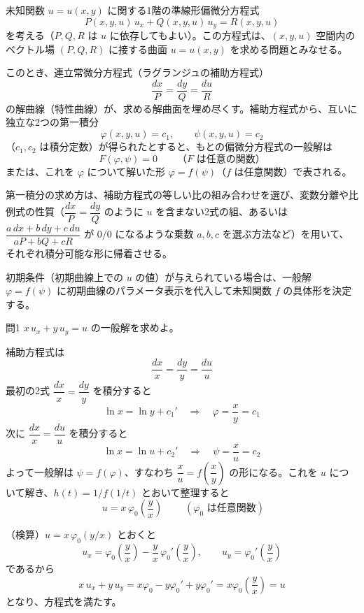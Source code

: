 \documentclass[a4paper,11pt]{article}
\begin{document}


\noindent
未知関数 $u = u(x,y)$ に関する1階の準線形偏微分方程式
\[
P(x,y,u)\,u_{x} + Q(x,y,u)\,u_{y} = R(x,y,u)
\]
を考える（$P, Q, R$ は $u$ に依存してもよい）。この方程式は、$(x,y,u)$ 空間内のベクトル場 $(P,Q,R)$ に接する曲面 $u = u(x,y)$ を求める問題とみなせる。

このとき、連立常微分方程式（ラグランジュの補助方程式）
\[
\frac{dx}{P} = \frac{dy}{Q} = \frac{du}{R}
\]
の解曲線（特性曲線）が、求める解曲面を埋め尽くす。補助方程式から、互いに独立な2つの第一積分
\[
\varphi(x,y,u) = c_{1}, \qquad \psi(x,y,u) = c_{2}
\]
（$c_{1}, c_{2}$ は積分定数）が得られたとすると、もとの偏微分方程式の一般解は
\[
F(\varphi, \psi) = 0 \qquad \text{（$F$ は任意の関数）}
\]
または、これを $\varphi$ について解いた形 $\varphi = f(\psi)$（$f$ は任意関数）で表される。

第一積分の求め方は、補助方程式の等しい比の組み合わせを選び、変数分離や比例式の性質（$\dfrac{dx}{P} = \dfrac{dy}{Q}$ のように $u$ を含まない2式の組、あるいは $\dfrac{a\,dx + b\,dy + c\,du}{aP+bQ+cR}$ が $0/0$ になるような乗数 $a,b,c$ を選ぶ方法など）を用いて、それぞれ積分可能な形に帰着させる。

初期条件（初期曲線上での $u$ の値）が与えられている場合は、一般解 $\varphi = f(\psi)$ に初期曲線のパラメータ表示を代入して未知関数 $f$ の具体形を決定する。

\clearpage
\begin{mondaiboxS}{問1}
$x\,u_{x} + y\,u_{y} = u$ の一般解を求めよ。
\end{mondaiboxS}
\kaitou
補助方程式は
\[
\frac{dx}{x} = \frac{dy}{y} = \frac{du}{u}
\]
最初の2式 $\dfrac{dx}{x} = \dfrac{dy}{y}$ を積分すると
\[
\ln x = \ln y + c_{1}' \quad\Longrightarrow\quad \varphi = \frac{x}{y} = c_{1}
\]
次に $\dfrac{dx}{x} = \dfrac{du}{u}$ を積分すると
\[
\ln x = \ln u + c_{2}' \quad\Longrightarrow\quad \psi = \frac{x}{u} = c_{2}
\]
よって一般解は $\psi = f(\varphi)$、すなわち $\dfrac{x}{u} = f\!\left(\dfrac{x}{y}\right)$ の形になる。これを $u$ について解き、$h(t) = 1/f(1/t)$ とおいて整理すると
\[
\boxed{\; u = x\,\varphi_{0}\!\left(\frac{y}{x}\right) \;}
\qquad (\varphi_{0} \text{ は任意関数})
\]

（検算）$u = x\,\varphi_{0}(y/x)$ とおくと
\[
u_{x} = \varphi_{0}\!\left(\frac{y}{x}\right) - \frac{y}{x}\,\varphi_{0}'\!\left(\frac{y}{x}\right), \qquad
u_{y} = \varphi_{0}'\!\left(\frac{y}{x}\right)
\]
であるから
\[
x\,u_{x} + y\,u_{y}
= x\varphi_{0} - y\varphi_{0}' + y\varphi_{0}'
= x\varphi_{0}\!\left(\frac{y}{x}\right) = u
\]
となり、方程式を満たす。
\end{document}
